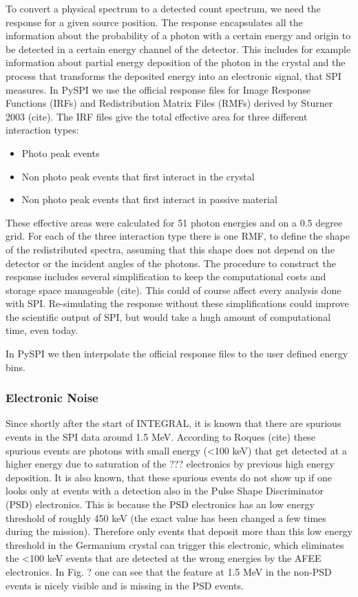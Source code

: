 \documentclass[modern]{aastex631}
\begin{document}
To convert a physical spectrum to a detected count spectrum, we need the response for a given source position. The response encapsulates all the information about the probability of a photon with a certain energy and origin to be detected in a certain energy channel of the detector. This includes for example information about partial energy deposition of the photon in the crystal and the process that transforms the deposited energy into an electronic signal, that SPI measures.
In PySPI we use the official response files for Image Response Functions (IRFs) and Redistribution Matrix Files (RMFs) derived by Sturner 2003 (cite). The IRF files give the total effective area for three different interaction types:
\begin{itemize}
  \item Photo peak events
  \item Non photo peak events that first interact in the crystal
  \item Non photo peak events that first interact in passive material
\end{itemize}

These effective areas were calculated for 51 photon energies and on a 0.5 degree grid. For each of the three interaction type there is one RMF, to define the shape of the redistributed spectra, assuming that this shape does not depend on the detector or the incident angles of the photons.
The procedure to construct the response includes several simplification to keep the computational costs and storage space manageable (cite). This could of course affect every analysis done with SPI. Re-simulating the response without these simplifications could improve the scientific output of SPI, but would take a hugh amount of computational time, even today.

In PySPI we then interpolate the official response files to the user defined energy bins.

\subsubsection*{Electronic Noise}

Since shortly after the start of INTEGRAL, it is known that there are spurious events in the SPI data around 1.5 MeV. According to Roques (cite) these spurious events are photons with small energy (<100 keV) that get detected at a higher energy due to saturation of the ??? electronics by previous high energy deposition. It is also known, that these spurious events do not show up if one looks only at events with a detection also in the Pulse Shape Discriminator (PSD) electronics. This is because the PSD electronics has an low energy threshold of roughly 450 keV (the exact value has been changed a few times during the mission). Therefore only events that deposit more than this low energy threshold in the Germanium crystal can trigger this electronic, which eliminates the <100 keV events that are detected at the wrong energies by the AFEE electronics. In Fig. ? one can see that the feature at 1.5 MeV in the non-PSD events is nicely visible and is missing in the PSD events.
\end{document}
